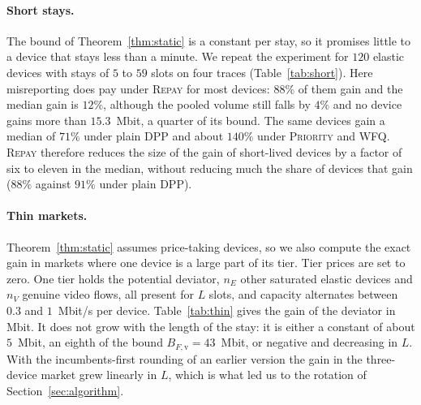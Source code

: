 \documentclass[preprint,11pt]{elsarticle}
\theoremstyle{definition}
\theoremstyle{remark}
\newcommand{\repay}{\textsc{Repay}}
\begin{document}
\paragraph{Short stays.}
The bound of Theorem~\ref{thm:static} is a constant per stay, so it promises little to a device that stays less than a minute.
We repeat the experiment for $120$ elastic devices with stays of $5$ to $59$ slots on four traces (Table~\ref{tab:short}).
Here misreporting does pay under \repay{} for most devices: $88\%$ of them gain and the median gain is $12\%$, although the pooled volume still falls by $4\%$ and no device gains more than $15.3$~Mbit, a quarter of its bound.
The same devices gain a median of $71\%$ under plain DPP and about $140\%$ under \textsc{Priority} and \textsc{WFQ}.
\repay{} therefore reduces the size of the gain of short-lived devices by a factor of six to eleven in the median, without reducing much the share of devices that gain ($88\%$ against $91\%$ under plain DPP).

\begin{table}[t]
\centering
\caption{Unilateral misreport by devices that stay $5$ to $59$ slots ($120$ devices on four traces).}
\label{tab:short}
\end{table}

\paragraph{Thin markets.}
Theorem~\ref{thm:static} assumes price-taking devices, so we also compute the exact gain in markets where one device is a large part of its tier.
Tier prices are set to zero. One tier holds the potential deviator, $n_E$ other saturated elastic devices and $n_V$ genuine video flows, all present for $L$ slots, and capacity alternates between $0.3$ and $1$~Mbit/s per device.
Table~\ref{tab:thin} gives the gain of the deviator in Mbit.
It does not grow with the length of the stay: it is either a constant of about $5$~Mbit, an eighth of the bound $B_{F,\mathrm{v}}=43$~Mbit, or negative and decreasing in $L$.
With the incumbents-first rounding of an earlier version the gain in the three-device market grew linearly in $L$, which is what led us to the rotation of Section~\ref{sec:algorithm}.
\end{document}
